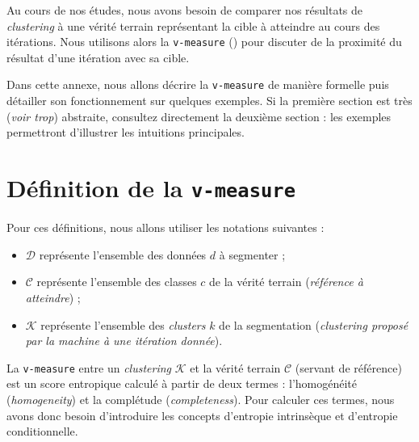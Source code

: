 \DontFrameThisInToc
{}
\label{annex:D-ANNEXE-EVALUATION-CLUSTERING}

	Au cours de nos études, nous avons besoin de comparer nos résultats de \textit{clustering} à une vérité terrain représentant la cible à atteindre au cours des itérations.
	Nous utilisons alors la \texttt{v-measure} (\cite{rosenberg-hirschberg:2007:vmeasure-conditional-entropybased}) pour discuter de la proximité du résultat d'une itération avec sa cible.
	
	\begin{leftBarAuthorOpinion}
		Dans cette annexe, nous allons décrire la \texttt{v-measure} de manière formelle puis détailler son fonctionnement sur quelques exemples.
		Si la première section est très (\textit{voir trop}) abstraite, consultez directement la deuxième section : les exemples permettront d'illustrer les intuitions principales.
	\end{leftBarAuthorOpinion}
	
	\minitoc

	\newpage
	\section{Définition de la \texttt{v-measure}}
	\label{annex:D.1-ANNEXE-EVALUATION-CLUSTERING-DEFINITION}
		
		Pour ces définitions, nous allons utiliser les notations suivantes :
		\begin{itemize}
			\item $\mathcal{D}$ représente l'ensemble des données $d$ à segmenter ;
			\item $\mathcal{C}$ représente l'ensemble des classes $c$ de la vérité terrain (\textit{référence à atteindre}) ;
			\item $\mathcal{K}$ représente l'ensemble des \textit{clusters} $k$ de la segmentation (\textit{clustering proposé par la machine à une itération donnée}).
		\end{itemize}
		
		
		La \texttt{v-measure} entre un \textit{clustering} $\mathcal{K}$ et la vérité terrain $\mathcal{C}$ (servant de référence) est un score entropique calculé à partir de deux termes : l'homogénéité (\textit{homogeneity}) et la complétude (\textit{completeness}).
		Pour calculer ces termes, nous avons donc besoin d'introduire les concepts d'entropie intrinsèque et d'entropie conditionnelle.
		\newline
		

